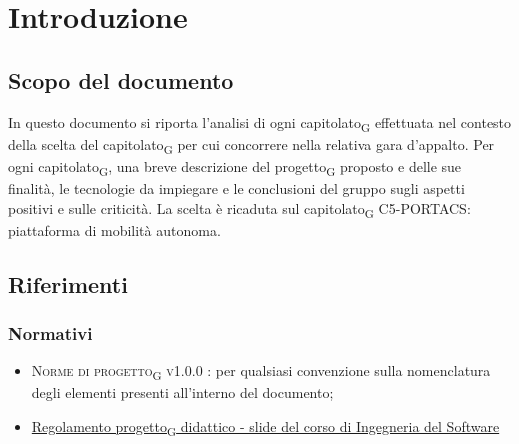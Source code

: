 \section{Introduzione}
\subsection{Scopo del documento}
In questo documento si riporta l'analisi di ogni capitolato\textsubscript{G} effettuata nel contesto della scelta del capitolato\textsubscript{G} per cui concorrere nella relativa gara d'appalto. Per ogni capitolato\textsubscript{G}, una breve descrizione del progetto\textsubscript{G} proposto e delle sue finalità, le tecnologie da impiegare e le conclusioni del gruppo sugli aspetti positivi e sulle criticità. La scelta è ricaduta sul capitolato\textsubscript{G} C5-PORTACS: piattaforma di mobilità autonoma.


\subsection{Riferimenti}

\subsubsection{Normativi}

\begin{itemize}
	\item \textsc{Norme di progetto\textsubscript{G} v1.0.0 }: per qualsiasi convenzione sulla nomenclatura degli elementi presenti all'interno del documento;
	\item \href{https://www.math.unipd.it/~tullio/IS-1/2020/Dispense/P1.pdf}{Regolamento progetto\textsubscript{G} didattico - slide del corso di Ingegneria del Software} \newline 
\end{itemize}

